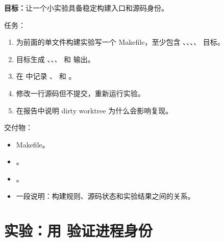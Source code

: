 \begin{labbox}
\textbf{目标：}让一个小实验具备稳定构建入口和源码身份。

任务：

\begin{enumerate}
  \item 为前面的单文件构建实验写一个 Makefile，至少包含 、、、、 目标。
  \item {} 目标生成 、、、 和  输出。
  \item 在  中记录 、 和 。
  \item 修改一行源码但不提交，重新运行实验。
  \item 在报告中说明 dirty worktree 为什么会影响复现。
\end{enumerate}

交付物：

\begin{itemize}
  \item Makefile。
  \item {}。
  \item {}。
  \item 一段说明：构建规则、源码状态和实验结果之间的关系。
\end{itemize}
\end{labbox}

\section{实验：用  验证进程身份}

